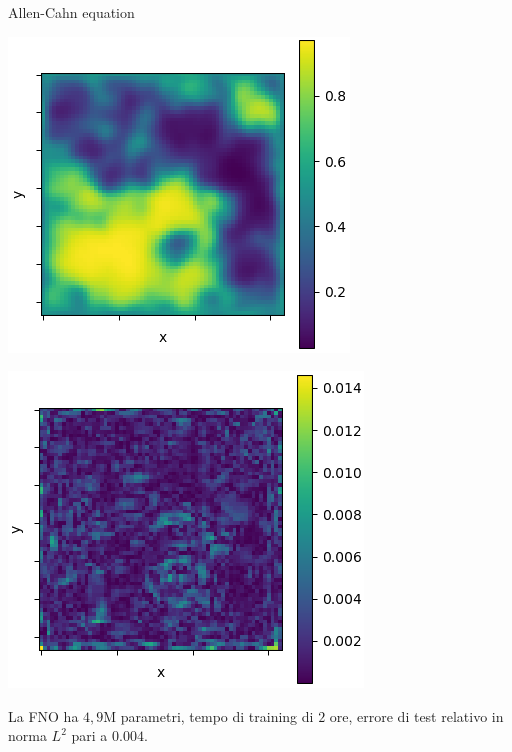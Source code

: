 \documentclass[aspectratio=169]{beamer}
\begin{document}
\begin{frame}[t]{Allen-Cahn equation}
\begin{center}
\begin{minipage}{0.24\textwidth}
        \end{minipage}
        \hfill
        \begin{minipage}{0.24\textwidth}
            \includegraphics[width=\textwidth]{operators/allen/FNOappro.png}
        \end{minipage}
        \hfill
        \begin{minipage}{0.24\textwidth}
            \includegraphics[width=\textwidth]{operators/allen/error.png}
        \end{minipage}
    \end{center}
    La FNO ha $4, 9$M parametri, tempo di training di $2$ ore, errore di test relativo in norma $L^{2}$ pari a $0.004$.
\end{frame}
\end{document}

